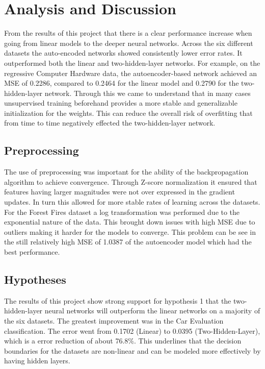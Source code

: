 \documentclass[twoside,11pt]{article}
\begin{document}
\section{Analysis and Discussion}
From the results of this project that there is a clear performance increase when going from linear models to the deeper neural networks. Across the six different datasets the auto-encoded networks showed consistently lower error rates. It outperformed both the  linear and two-hidden-layer networks. For example, on the regressive Computer Hardware data, the autoencoder-based network achieved an MSE of 0.2286, compared to 0.2464 for the linear model and 0.2790 for the two-hidden-layer network. Through this we came to understand that in many cases unsupervised training beforehand provides a more stable and generalizable initialization for the weights. This can reduce the overall risk of overfitting that from time to time negatively effected the two-hidden-layer network.

\subsection{Preprocessing}
The use of preprocessing was important for the ability of the backpropagation algorithm to achieve convergence. Through Z-score normalization it ensured that features having larger magnitudes were not over expressed in the gradient updates. In turn this allowed for more stable rates of learning across the datasets. For the Forest Fires dataset a log transformation was performed due to the exponential nature of the data. This brought down issues with high MSE due to outliers making it harder for the models to converge. This problem can be see in the still relatively high MSE of 1.0387 of the autoencoder model which had the best performance.  

\subsection{Hypotheses}
The results of this project show strong support for hypothesis 1 that the two-hidden-layer neural networks will outperform the linear networks on a majority of the six datasets. The greatest improvement was in the Car Evaluation classification. The error went from 0.1702 (Linear) to 0.0395 (Two-Hidden-Layer), which is a error reduction of about 76.8\%. This underlines that the decision boundaries for the datasets are non-linear and can be modeled more effectively by having hidden layers.
\end{document}
